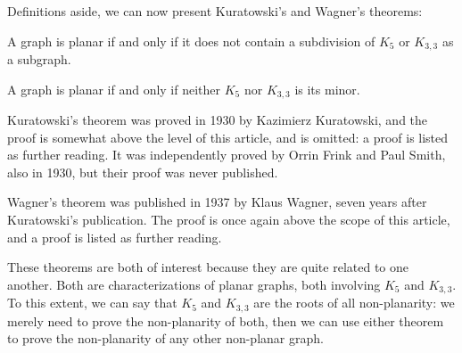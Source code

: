 \documentclass[11pt,paper=letter]{scrartcl}
\begin{document}
Definitions aside, we can now present Kuratowski's and Wagner's theorems:

\begin{theorem}
A graph is planar if and only if it does not contain a subdivision of $K_5$ or $K_{3,3}$ as a subgraph.
\end{theorem}

\begin{theorem}
A graph is planar if and only if neither $K_5$ nor $K_{3,3}$ is its minor.
\end{theorem}

Kuratowski's theorem was proved in 1930 by Kazimierz Kuratowski, and the proof is somewhat above the level of this article, and is omitted: a proof is listed as further reading. \cite{makarychev} It was independently proved by Orrin Frink and Paul Smith, also in 1930, but their proof was never published. 

Wagner's theorem was published in 1937 by Klaus Wagner, seven years after Kuratowski's publication. The proof is once again above the scope of this article, and a proof is listed as further reading. \cite{chudnovsky}

These theorems are both of interest because they are quite related to one another. Both are characterizations of planar graphs, both involving $K_5$ and $K_{3,3}$. To this extent, we can say that $K_5$ and $K_{3,3}$ are the roots of all non-planarity: we merely need to prove the non-planarity of both, then we can use either theorem to prove the non-planarity of any other non-planar graph.

\begin{center}
\end{center}
\end{document}
